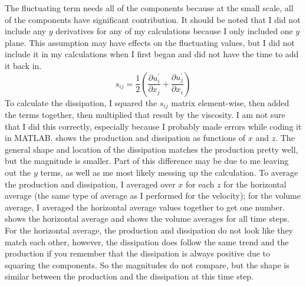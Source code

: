 \documentclass[11pt]{article}
\begin{document}
\begin{enumerate}
\begin{enumerate}
			The fluctuating term needs all of the components because at the small scale, all of the components have significant contribution. It should be noted that I did not include any $y$ derivatives for any of my calculations because I only included one $y$ plane. This assumption may have effects on the fluctuating values, but I did not include it in my calculations when I first began and did not have the time to add it back in. 
			\begin{equation}
				s_{ij} = \frac{1}{2} \left( \frac{\partial u^{\prime}_i}{\partial x_j} + \frac{\partial u^{\prime}_j}{\partial x_i} \right)
			\end{equation}
			To calculate the dissipation, I squared the $s_{ij}$ matrix element-wise, then added the terms together, then multiplied that result by the viscosity. I am not sure that I did this correctly, especially because I probably made errors while coding it in MATLAB.  shows the production and dissipation as functions of $x$ and $z$. The general shape and location of the dissipation matches the production pretty well, but the magnitude is smaller. Part of this difference may be due to me leaving out the $y$ terms, as well as me most likely messing up the calculation. To average the production and dissipation, I averaged over $x$ for each $z$ for the horizontal average (the same type of average as I performed for the velocity); for the volume average, I averaged the horizontal average values together to get one number.  shows the horizontal average and  shows the volume averages for all time steps. For the horizontal average, the production and dissipation do not look like they match each other, however, the dissipation does follow the same trend and the production if you remember that the dissipation is always positive due to squaring the components. So the magnitudes do not compare, but the shape is similar between the production and the dissipation at this time step.
			

\end{enumerate}
\end{enumerate}
\end{document}
